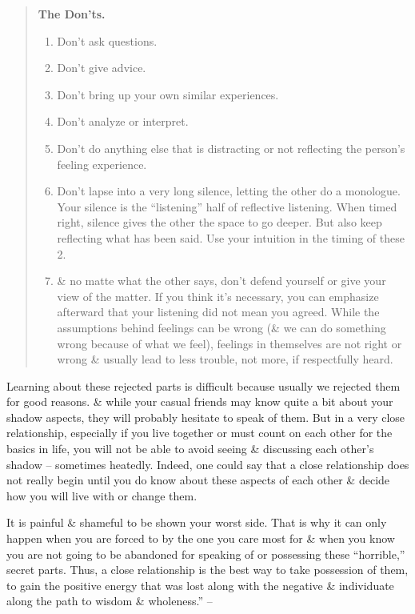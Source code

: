 \documentclass{article}
\numberwithin{equation}{section}
\begin{document}
\begin{quotation}
	\textbf{The Don'ts.}
	\begin{enumerate}
		\item Don't ask questions.
		\item Don't give advice.
		\item Don't bring up your own similar experiences.
		\item Don't analyze or interpret.
		\item Don't do anything else that is distracting or not reflecting the person's feeling experience.
		\item Don't lapse into a very long silence, letting the other do a monologue. Your silence is the ``listening'' half of reflective listening. When timed right, silence gives the other the space to go deeper. But also keep reflecting what has been said. Use your intuition in the timing of these 2.
		\item \& no matte what the other says, don't defend yourself or give your view of the matter. If you think it's necessary, you can emphasize afterward that your listening did not mean you agreed. While the assumptions behind feelings can be wrong (\& we can do something wrong because of what we feel), feelings in themselves are not right or wrong \& usually lead to less trouble, not more, if respectfully heard.
	\end{enumerate}
\end{quotation}
Learning about these rejected parts is difficult because usually we rejected them for good reasons. \& while your casual friends may know quite a bit about your shadow aspects, they will probably hesitate to speak of them. But in a very close relationship, especially if you live together or must count on each other for the basics in life, you will not be able to avoid seeing \& discussing each other's shadow -- sometimes heatedly. Indeed, one could say that a close relationship does not really begin until you do know about these aspects of each other \& decide how you will live with or change them.

It is painful \& shameful to be shown your worst side. That is why it can only happen when you are forced to by the one you care most for \& when you know you are not going to be abandoned for speaking of or possessing these ``horrible,'' secret parts. Thus, a close relationship is the best way to take possession of them, to gain the positive energy that was lost along with the negative \& individuate along the path to wisdom \& wholeness.'' -- \cite[pp. 191--193]{Aron2013}
\end{document}
